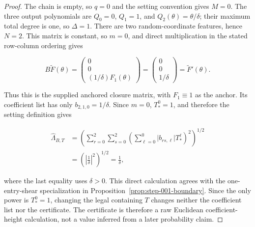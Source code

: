 \begin{proof}
The chain is empty, so \(q=0\) and the setting convention gives \(M=0\). The three
output polynomials are \(Q_0=0\), \(Q_1=1\), and \(Q_2(\theta)=\theta/\delta\); their maximum total degree is
one, so \(\Delta=1\). There are two random-coordinate features, hence \(N=2\). This matrix is constant,
so \(m=0\), and direct multiplication in the stated row-column ordering gives

\begin{equation}
\label{eq:appendix-display-341}
B\widetilde F(\theta)
=
\begin{pmatrix}
0\\ 0\\ (1/\delta)F_1(\theta)
\end{pmatrix}
=
\begin{pmatrix}
0\\ 0\\ 1/\delta
\end{pmatrix}
=\widetilde F'(\theta).
\end{equation}

Thus this is the supplied anchored closure matrix, with \(F_1\equiv1\) as the anchor. Its coefficient list has
only \(b_{2,1,0}=1/\delta\). Since \(m=0\), \(T_*^0=1\), and therefore the setting definition gives

\begin{equation}
\label{eq:appendix-display-342}
\begin{aligned}
\widehat\Lambda_{B,T}
&=\left(
\sum_{r=0}^{2}\sum_{s=0}^{2}
\left(\sum_{\ell=0}^{0}\lvert b_{rs,\ell}\rvert T_*^\ell\right)^2
\right)^{1/2}\\
&=\left(\left\lvert\frac1\delta\right\rvert^2\right)^{1/2}
=\frac1\delta,
\end{aligned}
\end{equation}

where the last equality uses \(\delta>0\). This direct calculation agrees with the one-entry-shear
specialization in Proposition~\ref{prop:step-001-boundary}. Since the only power is \(T_*^0=1\), changing the
legal containing \(T\) changes neither the coefficient list nor the certificate. The certificate is therefore
a raw Euclidean coefficient-height calculation, not a value inferred from a later probability claim.

\end{proof}


